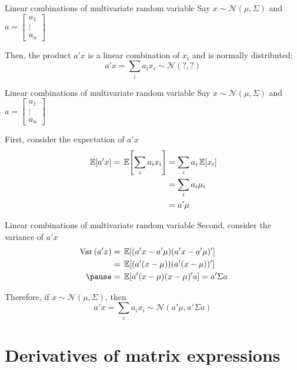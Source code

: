 \documentclass[aspectratio=169,t,11pt,table]{beamer}
\begin{document}

\begin{frame}{Linear combinations of multivariate random variable}
  Say $x \sim \mathcal{N}\left( \mu, \Sigma \right)$ and $a = \begin{bmatrix}a_1 \\ \vdots \\ a_n\end{bmatrix}$
  
  Then, the product $a' x$ is a linear combination of $x_i$ and is normally distributed:
  $$
    a'x = \sum_i a_i x_i \sim \mathcal{N}(?, ?)
  $$
\end{frame}

\begin{frame}{Linear combinations of multivariate random variable}
  Say $x \sim \mathcal{N}\left( \mu, \Sigma \right)$ and $a = \begin{bmatrix}a_1 \\ \vdots \\ a_n\end{bmatrix}$

  \bigskip
  First, consider the expectation of $a'x$
  \begin{align*}
    \expec{a'x} = \expec{\sum_i a_i x_i} &= \sum_i a_i \expec{x_i} \\
    &= \sum_i a_i \mu_i \\
    &= a' \mu
  \end{align*}
\end{frame}

\begin{frame}{Linear combinations of multivariate random variable}
  Second, consider the variance of $a'x$
  \begin{align*}
    \var{a'x} &= \expec{(a'x - a'\mu) (a'x - a'\mu)'} \\
    &= \expec{(a'(x - \mu)) (a'(x - \mu))'} \\
    \pause
    &= \expec{a' (x - \mu) (x - \mu)' a} = a' \Sigma a
  \end{align*}

  \pause
  \bigskip
  Therefore, if $x \sim \mathcal{N}\left( \mu, \Sigma \right)$, then
  $$
    a'x = \sum_i a_i x_i \sim \mathcal{N}(a'\mu, a'\Sigma a)
  $$
\end{frame}

\section{Derivatives of matrix expressions}
\end{document}
